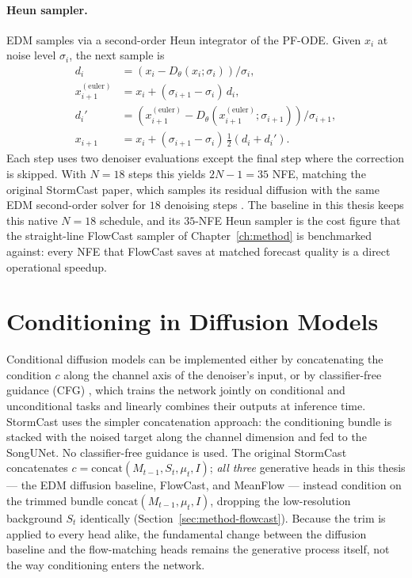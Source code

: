 \paragraph{Heun sampler.} EDM samples via a second-order Heun integrator of the PF-ODE. Given $x_i$ at noise level $\sigma_i$, the next sample is
\begin{align}
  d_i &= (x_i - D_\theta(x_i; \sigma_i)) / \sigma_i, \\
  x_{i+1}^{(\text{euler})} &= x_i + (\sigma_{i+1} - \sigma_i)\,d_i, \\
  d_i' &= (x_{i+1}^{(\text{euler})} - D_\theta(x_{i+1}^{(\text{euler})}; \sigma_{i+1})) / \sigma_{i+1}, \\
  x_{i+1} &= x_i + (\sigma_{i+1} - \sigma_i)\,\tfrac{1}{2}(d_i + d_i').
\end{align}
Each step uses two denoiser evaluations except the final step where the correction is skipped. With $N = 18$ steps this yields $2N-1 = 35$ NFE, matching the original StormCast paper, which samples its residual diffusion with the same EDM second-order solver for $18$ denoising steps \citep{pathak2024stormcast}. The baseline in this thesis keeps this native $N = 18$ schedule, and its $35$-NFE Heun sampler is the cost figure that the straight-line FlowCast sampler of Chapter~\ref{ch:method} is benchmarked against: every NFE that FlowCast saves at matched forecast quality is a direct operational speedup.

\section{Conditioning in Diffusion Models}
\label{sec:bg-conditioning}

Conditional diffusion models can be implemented either by concatenating the condition $c$ along the channel axis of the denoiser's input, or by classifier-free guidance (CFG) \citep{ho2022cfg}, which trains the network jointly on conditional and unconditional tasks and linearly combines their outputs at inference time. StormCast uses the simpler concatenation approach: the conditioning bundle is stacked with the noised target along the channel dimension and fed to the SongUNet. No classifier-free guidance is used. The original StormCast concatenates $c = \mathrm{concat}(M_{t-1}, S_t, \mu_t, I)$; \emph{all three} generative heads in this thesis --- the EDM diffusion baseline, FlowCast, and MeanFlow --- instead condition on the trimmed bundle $\mathrm{concat}(M_{t-1}, \mu_t, I)$, dropping the low-resolution background $S_t$ identically (Section~\ref{sec:method-flowcast}). Because the trim is applied to every head alike, the fundamental change between the diffusion baseline and the flow-matching heads remains the generative process itself, not the way conditioning enters the network.

